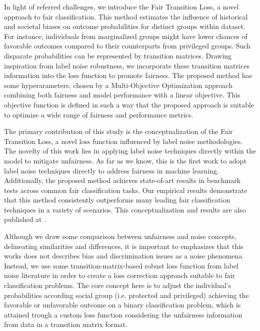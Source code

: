 In light of referred challenges, we introduce the Fair Transition Loss, a novel approach to fair classification. This method estimates the influence of historical and societal biases on outcome probabilities for distinct groups within dataset. For instance, individuals from marginalized groups might have lower chances of favorable outcomes compared to their counterparts from privileged groups. Such disparate probabilities can be represented by transition matrices. Drawing inspiration from label noise robustness, we incorporate these transition matrices information into the loss function to promote fairness. The proposed method has some hyperarameters, chosen by a Multi-Objective Optimization approach combining both fairness and model performance with a linear objective. This objective function is defined in such a way that the proposed approach is suitable to optimize a wide range of fairness and performance metrics.

The primary contribution of this study is the conceptualization of the Fair Transition Loss, a novel loss function influenced by label noise methodologies. The novelty of this work lies in applying label noise techniques directly within the model to mitigate unfairness. As far as we know, this is the first work to adopt label noise techniques directly to address fairness in machine learning. Additionally, the proposed method achieves state-of-art results in benchmark tests across common fair classification tasks. Our empirical results demonstrate that this method consistently outperforms many leading fair classification techniques in a variety of scenarios. This conceptualization and results are also published at \cite{Canalli2024}.

Although we draw some comparison between unfairness and noise concepts, delineating similarities and differences, it is important to emphasizes that this works does not describes bias and discrimination issues as a noise phenomena. Instead, we use some transition-matrix-based robust loss function from label noise literature in order to create a loss correction approach suitable to fair classification problems. The core concept here is to adjust the individual's probabilities according social group (i.e. protected and privileged) achieving the favorable or unfavorable outcome on a binary classification problem, which is attained trough a custom loss function considering the unfairness information from data in a transition matrix format.

